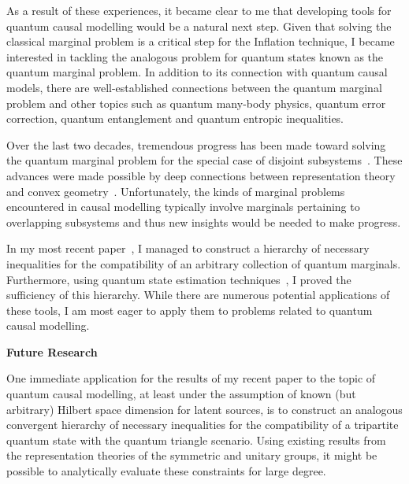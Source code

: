 \documentclass[12pt]{letter}
\begin{document}
\begin{letter}
As a result of these experiences, it became clear to me that developing tools for quantum causal modelling would be a natural next step. 
Given that solving the classical marginal problem is a critical step for the Inflation technique, I became interested in tackling the analogous problem for quantum states known as the quantum marginal problem.
In addition to its connection with quantum causal models, there are well-established connections between the quantum marginal problem and other topics such as quantum many-body physics, quantum error correction, quantum entanglement and quantum entropic inequalities. 

Over the last two decades, tremendous progress has been made toward solving the quantum marginal problem for the special case of disjoint subsystems~\parencite{klyachko2006quantum}. These advances were made possible by deep connections between representation theory and convex geometry~\parencite{walter2013entanglement}. Unfortunately, the kinds of marginal problems encountered in causal modelling typically involve marginals pertaining to overlapping subsystems and thus new insights would be needed to make progress.

In my most recent paper~\parencite{fraser2022sufficient}, I managed to construct a hierarchy of necessary inequalities for the compatibility of an arbitrary collection of quantum marginals. Furthermore, using quantum state estimation techniques~\parencite{keyl2006quantum}, I proved the sufficiency of this hierarchy. While there are numerous potential applications of these tools, I am most eager to apply them to problems related to quantum causal modelling.

\textbf{Future Research}

One immediate application for the results of my recent paper to the topic of quantum causal modelling, at least under the assumption of known (but arbitrary) Hilbert space dimension for latent sources, is to construct an analogous convergent hierarchy of necessary inequalities for the compatibility of a tripartite quantum state with the quantum triangle scenario. Using existing results from the representation theories of the symmetric and unitary groups, it might be possible to analytically evaluate these constraints for large degree.


\end{letter}
\end{document}

